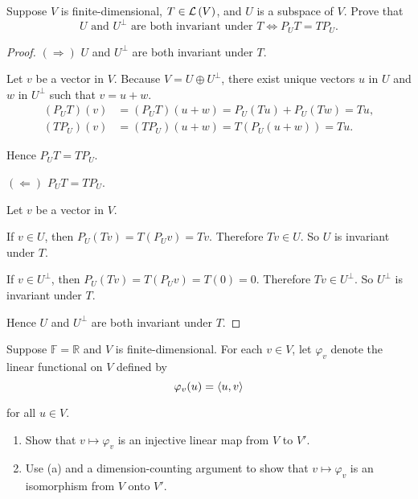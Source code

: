 \begin{exercise}
    Suppose $V$ is finite-dimensional, $T \in \mathcal{L}\left({V}\right)$, and $U$ is a subspace of $V$. Prove that
    \[
        \text{$U$ and $U^{\bot}$ are both invariant under $T$} \Longleftrightarrow P_{U}T = TP_{U}.
    \]
\end{exercise}

\begin{proof}
    $(\Rightarrow)$ $U$ and $U^{\bot}$ are both invariant under $T$.

    Let $v$ be a vector in $V$. Because $V = U\oplus U^{\bot}$, there exist unique vectors $u$ in $U$ and $w$ in $U^{\bot}$ such that $v = u + w$.
    \begin{align*}
        (P_{U}T)(v) & = (P_{U}T)(u + w) = P_{U}(Tu) + P_{U}(Tw) = Tu, \\
        (TP_{U})(v) & = (TP_{U})(u + w) = T(P_{U}(u + w)) = Tu.
    \end{align*}

    Hence $P_{U}T = TP_{U}$.

    \bigskip

    $(\Leftarrow)$ $P_{U}T = TP_{U}$.

    Let $v$ be a vector in $V$.

    If $v\in U$, then $P_{U}(Tv) = T(P_{U}v) = Tv$. Therefore $Tv\in U$. So $U$ is invariant under $T$.

    If $v\in U^{\bot}$, then $P_{U}(Tv) = T(P_{U}v) = T(0) = 0$. Therefore $Tv\in U^{\bot}$. So $U^{\bot}$ is invariant under $T$.

    Hence $U$ and $U^{\bot}$ are both invariant under $T$.
\end{proof}
\newpage

\begin{exercise}
    Suppose $\mathbb{F} = \mathbb{R}$ and $V$ is finite-dimensional. For each $v \in V$, let $\varphi_{v}$ denote the linear functional on $V$ defined by
    \[
        \varphi_{v}(u) = \left\langle{u, v}\right\rangle
    \]

    for all $u\in V$.
    \begin{enumerate}[label={(\alph*)}]
        \item Show that $v\mapsto \varphi_{v}$ is an injective linear map from $V$ to $V'$.
        \item Use (a) and a dimension-counting argument to show that $v\mapsto \varphi_{v}$ is an isomorphism from $V$ onto $V'$.
    \end{enumerate}
\end{exercise}


